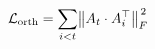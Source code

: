 \documentclass[preview]{standalone}
\begin{document}
\begin{align*}
\special{dvisvgm:raw <g id='unique000'>}\mathcal{L}_{\text{orth}} = \sum_{i<t} \bigl\| A_t \cdot A_i^{\top} \bigr\|_F^{\,2}\special{dvisvgm:raw </g>}
\end{align*}
\end{document}
